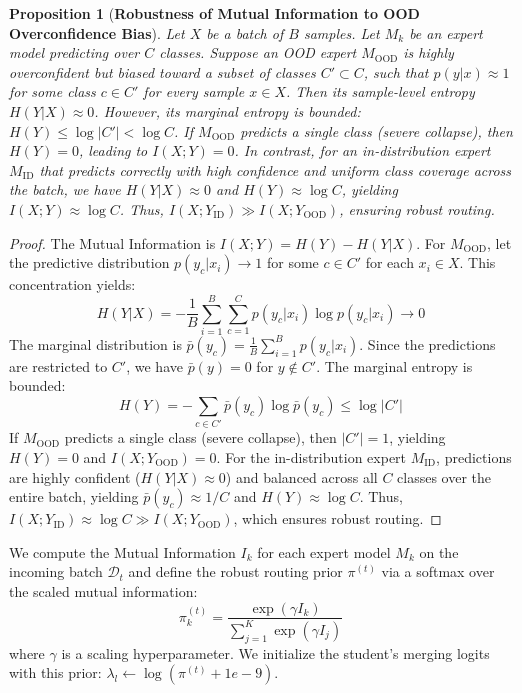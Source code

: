 \documentclass{article}
\theoremstyle{plain}
\newtheorem{proposition}[theorem]{Proposition}
\theoremstyle{definition}
\theoremstyle{remark}
\begin{document}
\begin{proposition}[\textbf{Robustness of Mutual Information to OOD Overconfidence Bias}]
Let $X$ be a batch of $B$ samples. Let $M_k$ be an expert model predicting over $C$ classes. Suppose an OOD expert $M_{\text{OOD}}$ is highly overconfident but biased toward a subset of classes $C' \subset C$, such that $p(y | x) \approx 1$ for some class $c \in C'$ for every sample $x \in X$. Then its sample-level entropy $H(Y|X) \approx 0$. However, its marginal entropy is bounded: $H(Y) \leq \log |C'| < \log C$. If $M_{\text{OOD}}$ predicts a single class (severe collapse), then $H(Y) = 0$, leading to $I(X; Y) = 0$.
In contrast, for an in-distribution expert $M_{\text{ID}}$ that predicts correctly with high confidence and uniform class coverage across the batch, we have $H(Y|X) \approx 0$ and $H(Y) \approx \log C$, yielding $I(X; Y) \approx \log C$. Thus, $I(X; Y_{\text{ID}}) \gg I(X; Y_{\text{OOD}})$, ensuring robust routing.
\end{proposition}
\begin{proof}
The Mutual Information is $I(X; Y) = H(Y) - H(Y|X)$. For $M_{\text{OOD}}$, let the predictive distribution $p(y_c | x_i) \to 1$ for some $c \in C'$ for each $x_i \in X$. This concentration yields:
\begin{equation*}
    H(Y|X) = - \frac{1}{B} \sum_{i=1}^B \sum_{c=1}^C p(y_c|x_i) \log p(y_c|x_i) \to 0
\end{equation*}
The marginal distribution is $\bar{p}(y_c) = \frac{1}{B} \sum_{i=1}^B p(y_c|x_i)$. Since the predictions are restricted to $C'$, we have $\bar{p}(y) = 0$ for $y \notin C'$. The marginal entropy is bounded:
\begin{equation*}
    H(Y) = - \sum_{c \in C'} \bar{p}(y_c) \log \bar{p}(y_c) \leq \log |C'|
\end{equation*}
If $M_{\text{OOD}}$ predicts a single class (severe collapse), then $|C'| = 1$, yielding $H(Y) = 0$ and $I(X; Y_{\text{OOD}}) = 0$.
For the in-distribution expert $M_{\text{ID}}$, predictions are highly confident ($H(Y|X) \approx 0$) and balanced across all $C$ classes over the entire batch, yielding $\bar{p}(y_c) \approx 1/C$ and $H(Y) \approx \log C$. Thus, $I(X; Y_{\text{ID}}) \approx \log C \gg I(X; Y_{\text{OOD}})$, which ensures robust routing.
\end{proof}

We compute the Mutual Information $I_k$ for each expert model $M_k$ on the incoming batch $\mathcal{D}_t$ and define the robust routing prior $\pi^{(t)}$ via a softmax over the scaled mutual information:
\begin{equation}
    \pi_k^{(t)} = \frac{\exp(\gamma I_k)}{\sum_{j=1}^K \exp(\gamma I_j)}
\end{equation}
where $\gamma$ is a scaling hyperparameter. We initialize the student's merging logits with this prior: $\lambda_l \leftarrow \log(\pi^{(t)} + 1e-9)$.
\end{document}
